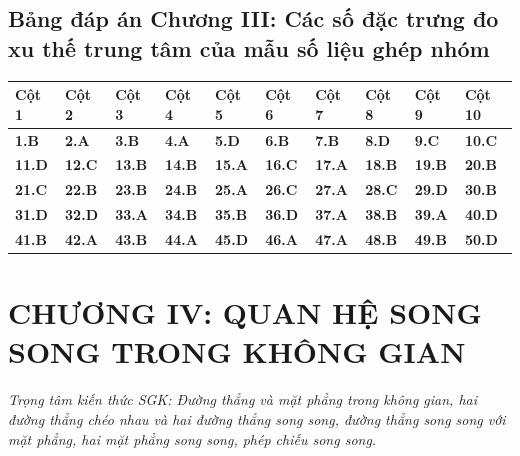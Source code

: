 \documentclass[11pt,a4paper]{article}
\begin{document}
\subsection*{\color{primary} Bảng đáp án Chương III: Các số đặc trưng đo xu thế trung tâm của mẫu số liệu ghép nhóm}
\begin{center}
\renewcommand{\arraystretch}{1.25}
\begin{tabularx}{\textwidth}{*{10}{>{\centering\arraybackslash}X}}
\toprule
\textbf{\color{primary} Cột 1} & \textbf{\color{primary} Cột 2} & \textbf{\color{primary} Cột 3} & \textbf{\color{primary} Cột 4} & \textbf{\color{primary} Cột 5} & \textbf{\color{primary} Cột 6} & \textbf{\color{primary} Cột 7} & \textbf{\color{primary} Cột 8} & \textbf{\color{primary} Cột 9} & \textbf{\color{primary} Cột 10} \\
\midrule
\textbf{1.B} & \textbf{2.A} & \textbf{3.B} & \textbf{4.A} & \textbf{5.D} & \textbf{6.B} & \textbf{7.B} & \textbf{8.D} & \textbf{9.C} & \textbf{10.C} \\
\rowcolor{rowtint} \textbf{11.D} & \textbf{12.C} & \textbf{13.B} & \textbf{14.B} & \textbf{15.A} & \textbf{16.C} & \textbf{17.A} & \textbf{18.B} & \textbf{19.B} & \textbf{20.B} \\
\textbf{21.C} & \textbf{22.B} & \textbf{23.B} & \textbf{24.B} & \textbf{25.A} & \textbf{26.C} & \textbf{27.A} & \textbf{28.C} & \textbf{29.D} & \textbf{30.B} \\
\rowcolor{rowtint} \textbf{31.D} & \textbf{32.D} & \textbf{33.A} & \textbf{34.B} & \textbf{35.B} & \textbf{36.D} & \textbf{37.A} & \textbf{38.B} & \textbf{39.A} & \textbf{40.D} \\
\textbf{41.B} & \textbf{42.A} & \textbf{43.B} & \textbf{44.A} & \textbf{45.D} & \textbf{46.A} & \textbf{47.A} & \textbf{48.B} & \textbf{49.B} & \textbf{50.D} \\
\bottomrule
\end{tabularx}
\end{center}\vspace{10pt}
\section*{\color{primary} CHƯƠNG IV: QUAN HỆ SONG SONG TRONG KHÔNG GIAN}
\textit{Trọng tâm kiến thức SGK: Đường thẳng và mặt phẳng trong không gian, hai đường thẳng chéo nhau và hai đường thẳng song song, đường thẳng song song với mặt phẳng, hai mặt phẳng song song, phép chiếu song song.}\par\vspace{4pt}
\end{document}
